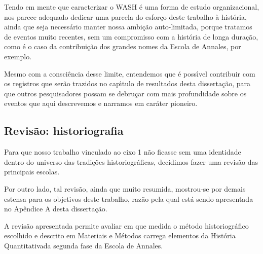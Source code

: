 \documentclass[
12pt,		%
openright,	%
twoside,  %
a4paper,			%
chapter=TITLE,		%
english,			%
french,				%
spanish,			%
brazil				%
]{USPSC-classe/USPSC}
\begin{document}
Tendo em mente que caracterizar o WASH \'e uma forma de estudo organizacional, nos parece adequado dedicar uma parcela do esfor\c{c}o deste trabalho \`a hist\'oria, ainda que seja necess\'ario manter nossa ambi\c{c}\~ao auto-limitada, porque tratamos de eventos muito recentes, sem um compromisso com a hist\'oria de longa dura\c{c}\~ao, como \'e o caso da contribui\c{c}\~ao dos grandes nomes da Escola de Annales, por exemplo.










Mesmo com a consci\^encia desse limite, entendemos que \'e poss\'{\i}vel contribuir com os registros que ser\~ao trazidos no cap\'{\i}tulo de resultados desta disserta\c{c}\~ao, para que outros pesquisadores possam se debru\c{c}ar com mais profundidade sobre os eventos que aqui descrevemos e narramos em car\'ater pioneiro.










\subsection[Revis\~ao: historiografia]{Revis\~ao: historiografia}\label{Revis\~ao: historiografia}
Para que nosso trabalho vinculado ao eixo 1 n\~ao ficasse sem uma identidade dentro do universo das tradi\c{c}\~oes historiogr\'aficas, decidimos fazer uma revis\~ao das principais escolas.










Por outro lado, tal revis\~ao, ainda que muito resumida, mostrou-se por demais estensa para os objetivos deste trabalho, raz\~ao pela qual est\'a sendo apresentada no Ap\^endice A desta disserta\c{c}\~ao.










A revis\~ao apresentada permite avaliar em que medida o m\'etodo historiogr\'afico escolhido e descrito em Materiais e M\'etodos carrega elementos da \textquotedbl Hist\'oria Quantitativa\textquotedbl  da segunda fase da Escola de Annales.
\end{document}
